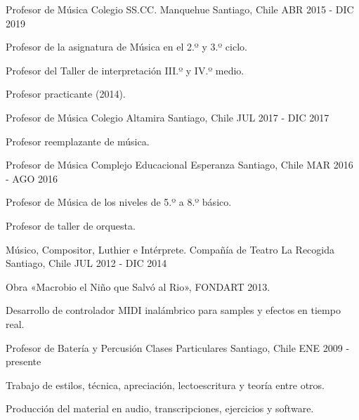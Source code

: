 \begin{cventries}
  \cventry
    {Profesor de Música} %
    {Colegio SS.CC. Manquehue} %
    {Santiago, Chile} %
    {ABR 2015 - DIC 2019} %
    {
      \begin{cvitems} %
        \item {Profesor de la asignatura de Música en el 2.º y 3.º ciclo.}
        \item {Profesor del Taller de interpretación III.º y IV.º medio.}
        \item {Profesor practicante (2014).}
      \end{cvitems}
    }

  \cventry
    {Profesor de Música}
    {Colegio Altamira}
    {Santiago, Chile}
    {JUL 2017 - DIC 2017}
    {
      \begin{cvitems} %
        \item {Profesor reemplazante de música.}
      \end{cvitems}
    }

  \cventry
    {Profesor de Música}
    {Complejo Educacional Esperanza}
    {Santiago, Chile}
    {MAR 2016 - AGO 2016}
    {
      \begin{cvitems} %
        \item {Profesor de Música de los niveles de 5.º a 8.º básico.}
        \item {Profesor de taller de orquesta.}
      \end{cvitems}
    }

  \cventry
    {Músico, Compositor, Luthier e Intérprete.}
    {Compañía de Teatro La Recogida}
    {Santiago, Chile}
    {JUL 2012 - DIC 2014}
    {
      \begin{cvitems} %
        \item {Obra «Macrobio el Niño que Salvó al Rio», FONDART 2013.}
        \item {Desarrollo de controlador MIDI inalámbrico para samples y efectos en tiempo real.}
      \end{cvitems}
    }   

  \cventry
    {Profesor de Batería y Percusión}
    {Clases Particulares}
    {Santiago, Chile}
    {ENE 2009 - presente}
    {
      \begin{cvitems} %
        \item {Trabajo de estilos, técnica, apreciación, lectoescritura y teoría entre otros.}
        \item {Producción del material en audio, transcripciones, ejercicios y software.}
      \end{cvitems}
    }


\end{cventries}
